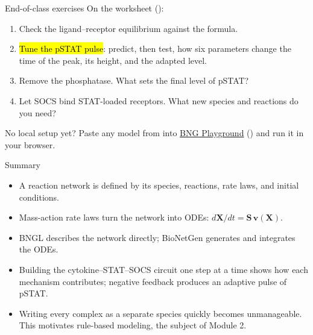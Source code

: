 \documentclass[aspectratio=169,10pt,t]{beamer}
\newcommand{\bngplayground}{https://ruleworld.github.io/bngplayground/}
\begin{document}
\begin{frame}{End-of-class exercises}
  On the worksheet ():
  \begin{enumerate}[<+->]
    \setlength\itemsep{1.5mm}
    \item[A.] Check the ligand--receptor equilibrium against the formula.
    \item[B.] \hl{Tune the pSTAT pulse}: predict, then test, how six parameters change
          the time of the peak, its height, and the adapted level.
    \item[C.] Remove the phosphatase. What sets the final level of pSTAT?
    \item[D.] Let SOCS bind STAT-loaded receptors. What new species and reactions
          do you need?
  \end{enumerate}
  \vskip3mm
  \onslide<+->
  {\small No local setup yet? Paste any model from  into
  \href{\bngplayground}{BNG Playground} ()
  and run it in your browser.}
\end{frame}

\begin{frame}{Summary}
  \begin{itemize}[<+->]
    \setlength\itemsep{2mm}
    \item A reaction network is defined by its species, reactions, rate laws, and
          initial conditions.
    \item Mass-action rate laws turn the network into ODEs:
          $d\mathbf{X}/dt = \mathbf{S}\,\mathbf{v}(\mathbf{X})$.
    \item BNGL describes the network directly; BioNetGen generates and integrates the ODEs.
    \item Building the cytokine--STAT--SOCS circuit one step at a time shows how each
          mechanism contributes; negative feedback produces an adaptive pulse of pSTAT.
    \item Writing every complex as a separate species quickly becomes unmanageable.
          This motivates rule-based modeling, the subject of Module 2.
  \end{itemize}
\end{frame}
\end{document}
